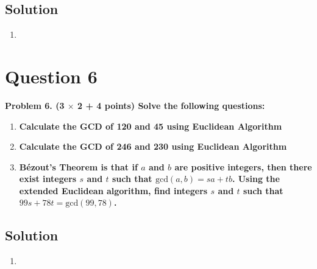 \documentclass[11pt]{article}
\begin{document}
    \subsection*{Solution}
    \begin{enumerate}[label=(\alph*)]
        \item
    \end{enumerate}


\clearpage
\section*{Question 6}

    \textbf{Problem 6. (3 $\times$ 2 + 4 points) Solve the following questions:}
    \begin{enumerate}[label=(\alph*)]
        \item \textbf{Calculate the GCD of 120 and 45 using Euclidean Algorithm}
        \item \textbf{Calculate the GCD of 246 and 230 using Euclidean Algorithm}
        \item \textbf{Bézout’s Theorem is that if $a$ and $b$ are positive integers, then there exist integers $s$ and $t$ such that $\text{gcd}(a, b) = sa + tb$. Using the extended Euclidean algorithm, find integers $s$ and $t$ such that $99s + 78t = \text{gcd}(99, 78)$.}
    \end{enumerate}

    \subsection*{Solution}
    \begin{enumerate}[label=(\alph*)]
        \item 
    \end{enumerate}
\end{document}
